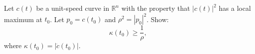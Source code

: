 Let $c(t)$ be a unit-speed curve in $\mathbb{R}^n$ with the property that $|c(t)|^2$ has a local maximum at $t_0$. Let $p_0 = c(t_0)$ and $\rho^2 = |p_0|^2$. Show:
$$\kappa(t_0) \geq \frac{1}{\rho},$$
where $\kappa(t_0) = |\ddot{c}(t_0)|$.
